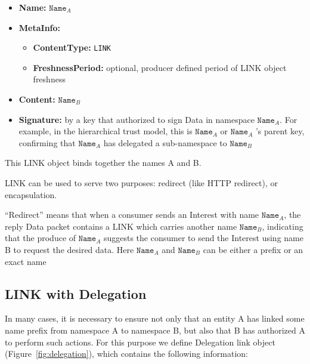\documentclass[10pt]{article}
\begin{document}
\begin{itemize}
\item \textbf{Name:} $\mathtt{Name}_A$
\item \textbf{MetaInfo:}
  \begin{itemize}
  \item \textbf{ContentType:} \verb|LINK|
  \item \textbf{FreshnessPeriod:} optional, producer defined period of LINK object freshness
  \end{itemize}
\item \textbf{Content:} $\mathtt{Name}_B$
\item \textbf{Signature:} by a key that authorized to sign Data in namespace $\mathtt{Name}_A$.
  For example, in the hierarchical trust model, this is $\mathtt{Name}_A$ or $\mathtt{Name}_A$ 's parent key, confirming that $\mathtt{Name}_A$ has delegated a sub-namespace to $\mathtt{Name}_B$
\end{itemize}

This LINK object binds together the names A and B.

LINK can be used to serve two purposes: redirect (like HTTP redirect), or encapsulation.

``Redirect'' means that when a consumer sends an Interest with name $\mathtt{Name}_A$, the reply Data packet contains a LINK which carries another name $\mathtt{Name}_B$, indicating that the produce of $\mathtt{Name}_A$ suggests the consumer to send the Interest using name B to request the desired data.
Here $\mathtt{Name}_A$ and $\mathtt{Name}_B$ can be either a prefix or an exact name

\subsection{LINK with Delegation}

In many cases, it is necessary to ensure not only that an entity A has linked some name prefix from namespace A to namespace B, but also that B has authorized A to perform such actions.
For this purpose we define Delegation link object (Figure~\ref{fig:delegation}), which contains the following information:
\end{document}

